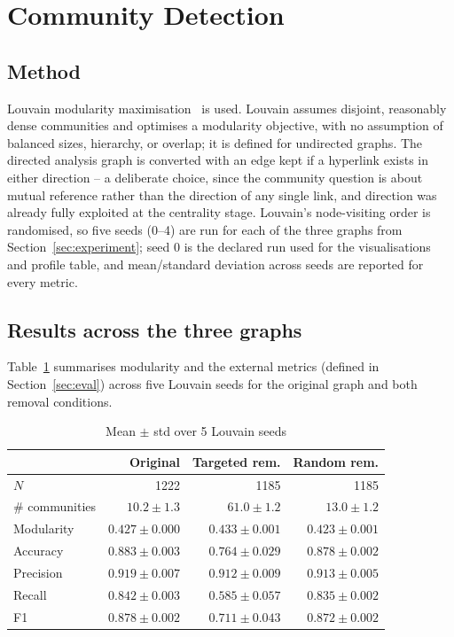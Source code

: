 \documentclass[10pt,conference]{IEEEtran}
\begin{document}
\section{Community Detection}
\label{sec:community}

\subsection{Method}
Louvain modularity maximisation~\cite{blondel2008} is used. Louvain assumes disjoint, reasonably
dense communities and optimises a modularity objective, with no assumption of balanced sizes,
hierarchy, or overlap; it is defined for undirected graphs. The directed analysis graph is converted
with an edge kept if a hyperlink exists in either direction -- a deliberate choice, since the
community question is about mutual reference rather than the direction of any single link, and
direction was already fully exploited at the centrality stage. Louvain's node-visiting order is
randomised, so five seeds (0--4) are run for each of the three graphs from Section~\ref{sec:experiment};
seed 0 is the declared run used for the visualisations and profile table, and mean/standard
deviation across seeds are reported for every metric.

\subsection{Results across the three graphs}
Table~\ref{tab:summary} summarises modularity and the external metrics (defined in
Section~\ref{sec:eval}) across five Louvain seeds for the original graph and both removal
conditions.

\begin{table}[h]
\centering
\caption{Mean $\pm$ std over 5 Louvain seeds}
\label{tab:summary}
\small
\begin{tabular}{@{}lrrr@{}}
\toprule
 & Original & Targeted rem. & Random rem. \\
\midrule
$N$ & 1222 & 1185 & 1185 \\
\# communities & $10.2\pm1.3$ & $61.0\pm1.2$ & $13.0\pm1.2$ \\
Modularity & $0.427\pm0.000$ & $0.433\pm0.001$ & $0.423\pm0.001$ \\
Accuracy & $0.883\pm0.003$ & $0.764\pm0.029$ & $0.878\pm0.002$ \\
Precision & $0.919\pm0.007$ & $0.912\pm0.009$ & $0.913\pm0.005$ \\
Recall & $0.842\pm0.003$ & $0.585\pm0.057$ & $0.835\pm0.002$ \\
F1 & $0.878\pm0.002$ & $0.711\pm0.043$ & $0.872\pm0.002$ \\
\bottomrule
\end{tabular}
\end{table}
\end{document}
